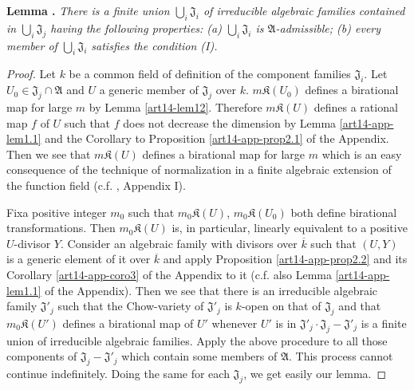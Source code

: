 \medskip
\noindent
{\bf Lemma .\label{art14-lem17}}
{\em There is a finite union $\bigcup_{i}\mathfrak{J}_{i}$ of irreducible algebraic families contained in $\bigcup_{i}\mathfrak{J}_{j}$ having the following properties: {\rm(a)} $\bigcup_{i}\mathfrak{J}_{i}$ is $\mathfrak{A}$-admissible; {\rm(b)} every member of $\bigcup_{i}\mathfrak{J}_{i}$ satisfies the condition {\rm(I)}.}

\begin{proof}
Let $k$ be a common field of definition of the component families $\mathfrak{J}_{i}$. Let $U_{0}\in \mathfrak{J}_{j}\cap \mathfrak{A}$ and $U$ a generic member of $\mathfrak{J}_{j}$ over $k$. $m\mathfrak{K}(U_{0})$ defines a birational map for large $m$ by Lemma \ref{art14-lem12}. Therefore $m\mathfrak{K}(U)$ defines a rational map $f$ of $U$ such that $f$ does not decrease the dimension by Lemma \ref{art14-app-lem1.1} and the Corollary to Proposition \ref{art14-app-prop2.1} of the Appendix. Then we see that $m\mathfrak{K}(U)$ defines a birational map for large $m$ which is an easy consequence of the technique of normalization in a finite algebraic extension of the function field (c.f. \cite{art14-key25}, Appendix I).

Fix\pageoriginale a positive integer $m_{0}$ such that $m_{0}\mathfrak{K}(U)$, $m_{0}\mathfrak{K}(U_{0})$ both define birational transformations. Then $m_{0}\mathfrak{K}(U)$ is, in particular, linearly equivalent to a positive $U$-divisor $Y$. Consider an algebraic family with divisors over $\overline{k}$ such that $(U,Y)$ is a generic element of it over $\overline{k}$ and apply Proposition \ref{art14-app-prop2.2} and its Corollary \ref{art14-app-coro3} of the Appendix to it (c.f. also Lemma \ref{art14-app-lem1.1} of the Appendix). Then we see that there is an irreducible algebraic family $\mathfrak{J}'_{j}$ such that the Chow-variety of $\mathfrak{J}'_{j}$ is $k$-open on that of $\mathfrak{J}_{j}$ and that $m_{0}\mathfrak{K}(U')$ defines a birational map of $U'$ whenever $U'$ is in $\mathfrak{J}'_{j}\cdot \mathfrak{J}_{j}-\mathfrak{J}'_{j}$ is a finite union of irreducible algebraic families. Apply the above procedure to all those components of $\mathfrak{J}_{j}-\mathfrak{J}'_{j}$ which contain some members of $\mathfrak{A}$. This process cannot continue indefinitely. Doing the same for each $\mathfrak{J}_{j}$, we get easily our lemma.
\end{proof}

